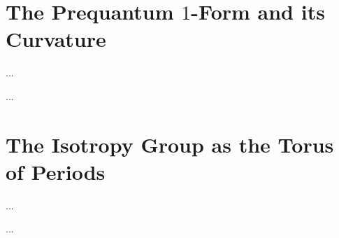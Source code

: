 \documentclass[10pt,reqno,letterpaper,twoside]{amsbook}
\begin{document}
  \section{The Prequantum $1$-Form and its Curvature}
  \label{sec:The Prequantum 1-Form and its Curvature}
  
  \begin{article}
    \label{art:existence-prequantum-form}
    ...
  \end{article}
  
  \begin{article}
    \label{art:curvature-prequantum-form}
    ...
  \end{article}
  
  \section{The Isotropy Group as the Torus of Periods}
  \label{sec:The Isotropy Group as the Torus of Periods}
  
  \begin{article}
    \label{art:isotropy-statement}
    ...
  \end{article}
  
  \begin{article}
    \label{art:isotropy-subduction}
    ...
  \end{article}
  
\end{document}
